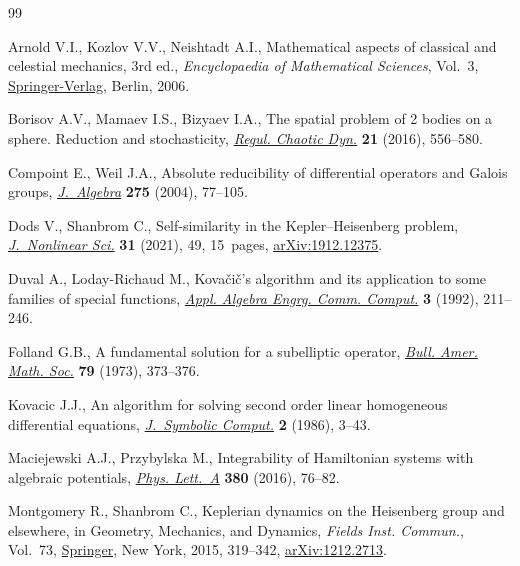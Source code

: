 \documentclass[pdftex]{sigma}
\numberwithin{equation}{section}
\begin{document}
\begin{thebibliography}{99}
\footnotesize\itemsep=0pt

Arnold V.I., Kozlov V.V., Neishtadt A.I., Mathematical aspects of classical and
 celestial mechanics, 3rd ed., \textit{Encyclopaedia of Mathematical Sciences}, Vol.~3, \href{https://doi.org/10.1007/978-3-540-48926-9}{Springer-Verlag}, Berlin, 2006.

Borisov A.V., Mamaev I.S., Bizyaev I.A., The spatial problem of 2 bodies on a
 sphere. {R}eduction and stochasticity, \href{https://doi.org/10.1134/S1560354716050075}{\textit{Regul. Chaotic Dyn.}}
 \textbf{21} (2016), 556--580.

Compoint E., Weil J.A., Absolute reducibility of differential operators and
 {G}alois groups, \href{https://doi.org/10.1016/j.jalgebra.2003.11.010}{\textit{J.~Algebra}} \textbf{275} (2004), 77--105.

Dods V., Shanbrom C., Self-similarity in the {K}epler--{H}eisenberg problem,
 \href{https://doi.org/10.1007/s00332-021-09709-1}{\textit{J.~Nonlinear Sci.}} \textbf{31} (2021), 49, 15~pages,
 \href{https://arxiv.org/abs/1912.12375}{arXiv:1912.12375}.

Duval A., Loday-Richaud M., Kova\v{c}i\v{c}'s algorithm and its application to
 some families of special functions, \href{https://doi.org/10.1007/BF01268661}{\textit{Appl. Algebra Engrg. Comm.
 Comput.}} \textbf{3} (1992), 211--246.

Folland G.B., A fundamental solution for a subelliptic operator, \href{https://doi.org/10.1090/S0002-9904-1973-13171-4}{\textit{Bull.
 Amer. Math. Soc.}} \textbf{79} (1973), 373--376.

Kovacic J.J., An algorithm for solving second order linear homogeneous
 differential equations, \href{https://doi.org/10.1016/S0747-7171(86)80010-4}{\textit{J.~Symbolic Comput.}} \textbf{2} (1986),
 3--43.

Maciejewski A.J., Przybylska M., Integrability of {H}amiltonian systems with
 algebraic potentials, \href{https://doi.org/10.1016/j.physleta.2015.08.035}{\textit{Phys. Lett.~A}} \textbf{380} (2016), 76--82.

Montgomery R., Shanbrom C., Keplerian dynamics on the {H}eisenberg group and
 elsewhere, in Geo\-met\-ry, Mechanics, and Dynamics, \textit{Fields Inst.
 Commun.}, Vol.~73, \href{https://doi.org/10.1007/978-1-4939-2441-7_14}{Springer}, New York, 2015, 319--342, \href{https://arxiv.org/abs/1212.2713}{arXiv:1212.2713}.


\end{thebibliography}
\end{document}
